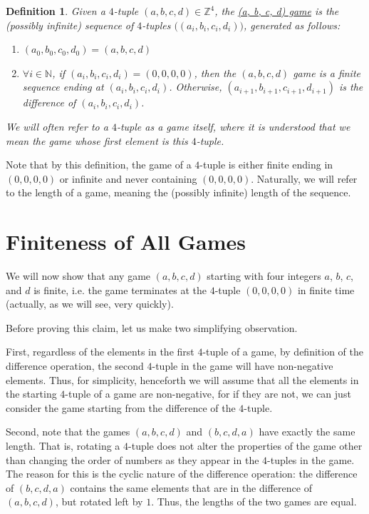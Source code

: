 \documentclass[12pt]{amsart}
\newtheorem{definition}[theorem]{Definition}
\newcommand{\znn}{\mathbb{N}}
\begin{document}
\begin{definition}
Given a $4$-tuple $(a, b, c, d)\in \mathbb{Z}^4$, the \underline{(a, b, c, d) game} is the (possibly infinite) sequence of $4$-tuples $\big((a_i, b_i, c_i, d_i)\big)$, generated as follows:

\begin{enumerate}
\item $(a_0, b_0, c_0, d_0) = (a, b, c, d)$
\item $\forall i\in \znn$, if $(a_i, b_i, c_i, d_i) = (0, 0, 0, 0)$, then the $(a, b, c, d)$ game is a finite sequence ending at $(a_i, b_i, c_i, d_i)$. Otherwise, $(a_{i+1}, b_{i+1}, c_{i+1}, d_{i+1})$ is the difference of $(a_i, b_i, c_i, d_i)$.
\end{enumerate}

We will often refer to a $4$-tuple as a game itself, where it is understood that we mean the game whose first element is this $4$-tuple.

\end{definition}

Note that by this definition, the game of a $4$-tuple is either finite ending in $(0, 0, 0, 0)$ or infinite and never containing $(0, 0, 0, 0)$. Naturally, we will refer to the length of a game, meaning the (possibly infinite) length of the sequence.

\section{Finiteness of All Games\label{sec:convergence}}

We will now show that any game $(a,b,c,d)$ starting with four integers $a$, $b$, $c$, and $d$ is finite, i.e. the game terminates at the $4$-tuple $(0,0,0,0)$ in finite time (actually, as we will see, very quickly).

Before proving this claim, let us make two simplifying observation.

First, regardless of the elements in the first $4$-tuple of a game, by definition of the difference operation, the second $4$-tuple in the game will have non-negative elements. Thus, for simplicity, henceforth we will assume that all the elements in the starting $4$-tuple of a game are non-negative, for if they are not, we can just consider the game starting from the difference of the $4$-tuple.

Second, note that the games $(a,b,c,d)$ and $(b,c,d,a)$ have exactly the same length. That is, rotating a $4$-tuple does not alter the properties of the game other than changing the order of numbers as they appear in the $4$-tuples in the game. The reason for this is the cyclic nature of the difference operation: the difference of $(b,c,d,a)$ contains the same elements that are in the difference of $(a,b,c,d)$, but rotated left by $1$. Thus, the lengths of the two games are equal.
\end{document}
